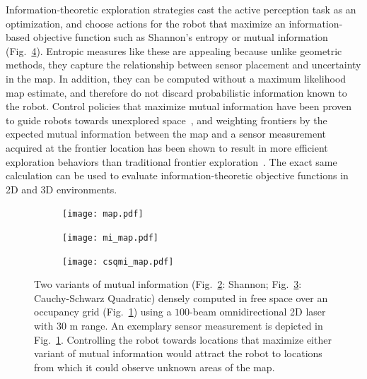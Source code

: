 Information-theoretic exploration strategies cast the active perception task as
an optimization, and choose actions for the robot that maximize an information-based objective function such
as Shannon's entropy or mutual
information~\cite{bourgault2002information,kollar2008efficient,charrow2015icra,julian2013mutual}
(Fig.~\ref{fig:mi_vs_csqmi}).
Entropic measures like these are appealing because unlike geometric methods,
they capture the relationship between sensor placement and uncertainty in the
map. In addition, they can be computed without a maximum likelihood map estimate, and
therefore do not discard probabilistic information known to the robot. Control policies
that maximize mutual information have been proven to guide robots
towards unexplored space~\cite{julian2013mutual}, and weighting frontiers by
the expected mutual information between the map and a sensor measurement
acquired at the frontier location has been shown to result in more efficient exploration
behaviors than traditional frontier exploration~\cite{charrow2015icra}.
The exact same calculation can be used to evaluate information-theoretic objective
functions in 2D and 3D environments.

\begin{figure}[b]
    \centering
    \begin{subfigure}[t]{0.31\textwidth}
        \centering
        \texttt{[image: map.pdf]}
        \caption{\label{fig:og}}
    \end{subfigure}
    \begin{subfigure}[t]{0.31\textwidth}
        \centering
        \texttt{[image: mi\_map.pdf]}
        \caption{\label{fig:og_mi}}
    \end{subfigure}
    \begin{subfigure}[t]{0.31\textwidth}
        \centering
        \texttt{[image: csqmi\_map.pdf]}
        \caption{\label{fig:og_csqmi}}
    \end{subfigure}
    \caption{Two variants of mutual information (Fig.~\ref{fig:og_mi}: Shannon;
    Fig.~\ref{fig:og_csqmi}: Cauchy-Schwarz Quadratic) densely computed in free space
  over an occupancy grid (Fig.~\ref{fig:og}) using a $100$-beam omnidirectional 2D
laser with $30$ m range. An exemplary sensor measurement is depicted in
Fig.~\ref{fig:og}. Controlling the robot towards locations that maximize either variant
of mutual information would attract the robot to locations from which it
could observe unknown areas of the map. \label{fig:mi_vs_csqmi}}
\end{figure}

